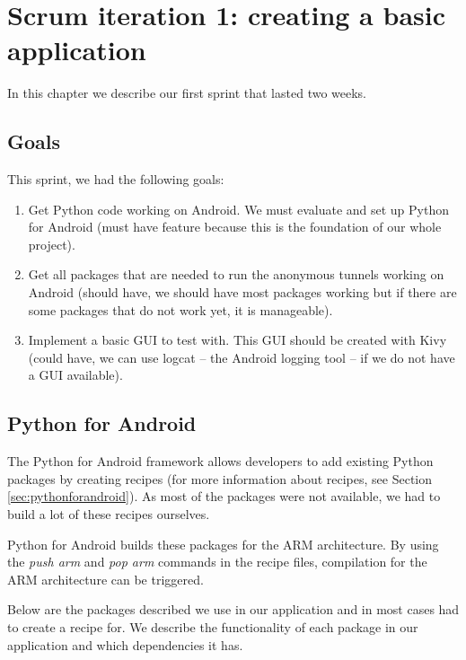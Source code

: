 \chapter{Scrum iteration 1: creating a basic application}
\label{cpt:iteration1}
	In this chapter we describe our first sprint that lasted two weeks.

	\section{Goals}
		This sprint, we had the following goals:
	
		\begin{enumerate}
			\item Get Python code working on Android. We must evaluate and set up Python for Android (must have feature because this is the foundation of our whole project).
			\item Get all packages that are needed to run the anonymous tunnels working on Android (should have, we should have most packages working but if there are some packages that do not work yet, it is manageable).
			\item Implement a basic GUI to test with. This GUI should be created with Kivy (could have, we can use logcat -- the Android logging tool -- if we do not have a GUI available).
		\end{enumerate}
	
	\section{Python for Android}
		The Python for Android framework allows developers to add existing Python packages by creating recipes (for more information about recipes, see Section \ref{sec:pythonforandroid}). As most of the packages were not available, we had to build a lot of these recipes ourselves.
	
		Python for Android builds these packages for the ARM architecture. By using the \emph{push arm} and \emph{pop arm} commands in the recipe files, compilation for the ARM architecture can be triggered.
	
		Below are the packages described we use in our application and in most cases had to create a recipe for. We describe the functionality of each package in our application and which dependencies it has.
	
